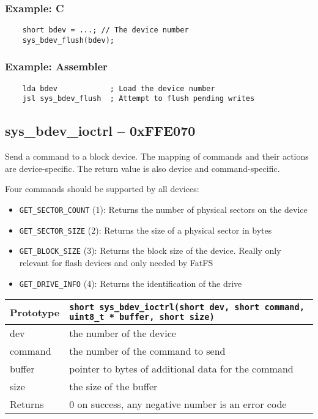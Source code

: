 \subsubsection*{Example: C}
\begin{lstlisting}
    short bdev = ...; // The device number
    sys_bdev_flush(bdev);
\end{lstlisting}

\subsubsection*{Example: Assembler}
\begin{verbatim}
    lda bdev            ; Load the device number
    jsl sys_bdev_flush  ; Attempt to flush pending writes
\end{verbatim}

\subsection*{sys\_bdev\_ioctrl -- 0xFFE070}
Send a command to a block device. The mapping of commands and their actions are device-specific. The return value is also device and command-specific.

Four commands should be supported by all devices:
\begin{itemize}
    \item \verb+GET_SECTOR_COUNT+ (1): Returns the number of physical sectors on the device
    \item \verb+GET_SECTOR_SIZE+ (2): Returns the size of a physical sector in bytes
    \item \verb+GET_BLOCK_SIZE+ (3): Returns the block size of the device. Really only relevant for flash devices and only needed by FatFS
    \item \verb+GET_DRIVE_INFO+ (4): Returns the identification of the drive
\end{itemize}

\bigskip

\begin{tabular}{|l||l|} \hline
Prototype & \lstinline!short sys_bdev_ioctrl(short dev, short command, uint8_t * buffer, short size)! \\ \hline
dev & the number of the device \\ \hline
command & the number of the command to send \\ \hline
buffer & pointer to bytes of additional data for the command \\ \hline
size & the size of the buffer \\ \hline
Returns & 0 on success, any negative number is an error code \\ \hline
\end{tabular}

